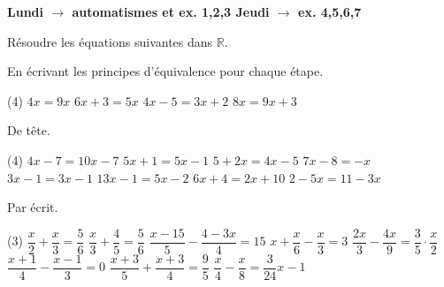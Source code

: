 \usepackage[serie,niveau={1MA1},nfiche={}, annee={Emilie-Gourd, 2024--2025}, auteur={ns},theme={Série 8}]{packages/bandeaux}
\usepackage{packages/boites}
\usepackage{packages/fontes}
\usepackage{packages/courslatex}
\newcommand{\path}{./}






{\bfseries Lundi $\longrightarrow$ automatismes et ex. 1,2,3  \hfill Jeudi $\longrightarrow$ ex. 4,5,6,7}


Résoudre les équations suivantes dans $\mathbb{R}$.

En écrivant les principes d'équivalence pour chaque étape.
	\begin{tasks}(4)
\task $4 x=9 x$
\task $6 x+3=5 x$
\task $4 x-5=3 x+2$
\task $8 x=9 x+3$
\end{tasks}
De tête.
\begin{tasks}(4)
\task $4 x-7=10 x-7$
\task $5 x+1=5 x-1$
\task $5+2 x=4 x-5$
\task $7 x-8=-x$
\task $3 x-1=3 x-1$
\task $13 x-1=5 x-2$
\task $6 x+4=2 x+10$
\task $2-5 x=11-3 x$
\end{tasks}

Par écrit.
	\begin{tasks}(3)
\task $\dfrac{x}{2}+\dfrac{x}{3}=\dfrac{5}{6}$
\task $\dfrac{x}{3}+\dfrac{4}{5}=\dfrac{5}{6}$
\task $\dfrac{x-15}{5}-\dfrac{4-3 x}{4}=15$
\task $x+\dfrac{x}{6}-\dfrac{x}{3}=3$
\task $\dfrac{2 x}{3}-\dfrac{4 x}{9}=\dfrac{3}{5} \cdot \dfrac{x}{2}$
\task $\dfrac{x+1}{4}-\dfrac{x-1}{3}=0$
\task $\dfrac{x+3}{5}+\dfrac{x+3}{4}=\dfrac{9}{5}$
\task $\dfrac{x}{4}-\dfrac{x}{8}=\dfrac{3}{24} x-1$
	\end{tasks}
	\begin{comment}
\begin{exo}[1]
Résoudre quatre fois de suite l'équation $\dfrac{x}{2}-3 x=\dfrac{5}{4}+x$, en utilisant la méthode proposée :
	\begin{tasks}
\task Votre manière de faire. 

(Dans les méthodes b), c) et d), simplifier au fur et à mesure l'expression obtenue.)
\task $\left[P E_2\right]$, en multipliant par 4 ; puis $\left[P E_1\right]$, en ajoutant $-4 x$; puis $\left[P E_2\right]$, en multipliant par $-\dfrac{1}{14}$.
\task $\left[P E_1\right]$, en ajoutant $-x$; puis $\left[P E_2\right]$, en multipliant par 2 ; puis $\left[P E_2\right]$, en multipliant par $-\dfrac{1}{7}$.
\task $\left[P E_1\right]$, en ajoutant $\dfrac{5}{2} x$; puis $\left[P E_1\right]$, en ajoutant $-\dfrac{5}{4} ;$ puis $\left[P E_2\right]$, en multipliant par $\dfrac{2}{7}$.
	\end{tasks}
\end{exo}

	\end{comment}

